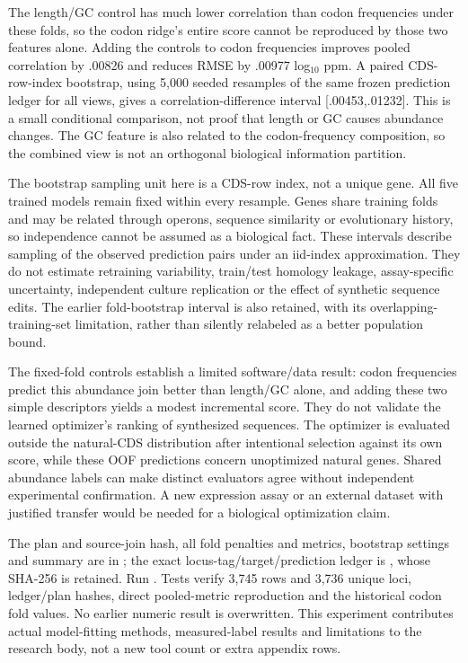The length/GC control has much lower correlation than codon frequencies under these folds, so the codon ridge's entire score cannot be reproduced by those two features alone. Adding the controls to codon frequencies improves pooled correlation by .00826 and reduces RMSE by .00977 log$_{10}$ ppm. A paired CDS-row-index bootstrap, using 5,000 seeded resamples of the same frozen prediction ledger for all views, gives a correlation-difference interval [.00453,.01232]. This is a small conditional comparison, not proof that length or GC causes abundance changes. The GC feature is also related to the codon-frequency composition, so the combined view is not an orthogonal biological information partition.

The bootstrap sampling unit here is a CDS-row index, not a unique gene. All five trained models remain fixed within every resample. Genes share training folds and may be related through operons, sequence similarity or evolutionary history, so independence cannot be assumed as a biological fact. These intervals describe sampling of the observed prediction pairs under an iid-index approximation. They do not estimate retraining variability, train/test homology leakage, assay-specific uncertainty, independent culture replication or the effect of synthetic sequence edits. The earlier fold-bootstrap interval is also retained, with its overlapping-training-set limitation, rather than silently relabeled as a better population bound.

The fixed-fold controls establish a limited software/data result: codon frequencies predict this abundance join better than length/GC alone, and adding these two simple descriptors yields a modest incremental score. They do not validate the learned optimizer's ranking of synthesized sequences. The optimizer is evaluated outside the natural-CDS distribution after intentional selection against its own score, while these OOF predictions concern unoptimized natural genes. Shared abundance labels can make distinct evaluators agree without independent experimental confirmation. A new expression assay or an external dataset with justified transfer would be needed for a biological optimization claim.

The plan and source-join hash, all fold penalties and metrics, bootstrap settings and summary are in ; the exact locus-tag/target/prediction ledger is , whose SHA-256 is retained. Run . Tests verify 3,745 rows and 3,736 unique loci, ledger/plan hashes, direct pooled-metric reproduction and the historical codon fold values. No earlier numeric result is overwritten. This experiment contributes actual model-fitting methods, measured-label results and limitations to the research body, not a new tool count or extra appendix rows.

